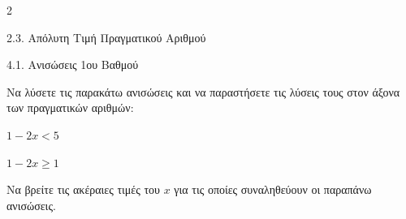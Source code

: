 \begin{ylh}{2}
    \item 2.3. Απόλυτη Τιμή Πραγματικού Αριθμού
    \item 4.1. Ανισώσεις 1ου Βαθμού
\end{ylh}

\begin{alist}
\item Να λύσετε τις παρακάτω ανισώσεις και να παραστήσετε τις λύσεις τους στον άξονα των πραγματικών αριθμών:
\begin{rlist}
\item
  $1 - 2x < 5$ 
\item
  $1 - 2x \ge 1$ 
\end{rlist}
\item Να βρείτε τις ακέραιες τιμές του $x$ για τις οποίες συναληθεύουν οι παραπάνω ανισώσεις.
\end{alist}

